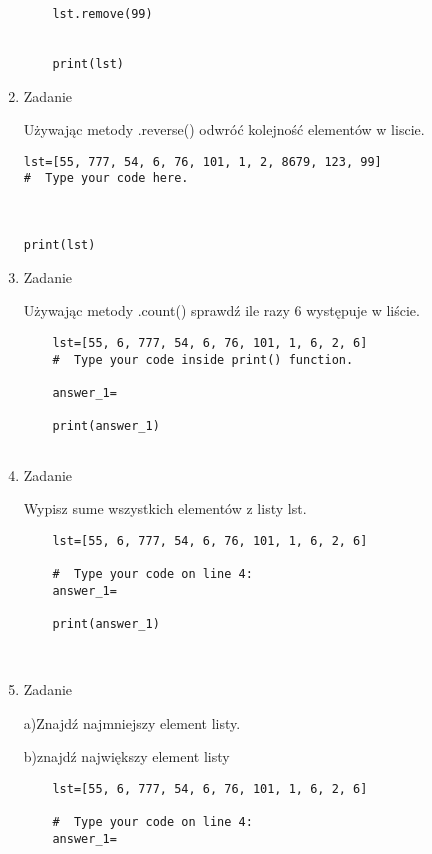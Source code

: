 \documentclass[11pt]{article}
\begin{document}
\begin{enumerate}
\begin{lstlisting}
	lst.remove(99)
	
	
	print(lst)
\end{lstlisting}

	\item
\begin{Large}
	Zadanie
\end{Large}
\par
Używając metody .reverse() odwróć kolejność elementów w liscie.
\begin{lstlisting}	
lst=[55, 777, 54, 6, 76, 101, 1, 2, 8679, 123, 99]
#  Type your code here.



print(lst)
\end{lstlisting}

	\item
\begin{Large}
	Zadanie
\end{Large}
\par
Używając metody .count() sprawdź ile razy 6 występuje w liście.
\begin{lstlisting}	
	lst=[55, 6, 777, 54, 6, 76, 101, 1, 6, 2, 6]
	#  Type your code inside print() function.
	
	answer_1=
	
	print(answer_1)
	
\end{lstlisting}


	\item
\begin{Large}
	Zadanie
\end{Large}
\par
Wypisz sume wszystkich elementów z listy lst.
\begin{lstlisting}	
	lst=[55, 6, 777, 54, 6, 76, 101, 1, 6, 2, 6]
	
	#  Type your code on line 4:
	answer_1=
	
	print(answer_1)
	
	
\end{lstlisting}


	\item
\begin{Large}
	Zadanie
\end{Large}
\par
a)Znajdź najmniejszy element listy.
\par
b)znajdź największy element listy
\begin{lstlisting}	
	lst=[55, 6, 777, 54, 6, 76, 101, 1, 6, 2, 6]
	
	#  Type your code on line 4:
	answer_1=
	

\end{lstlisting}
\end{enumerate}
\end{document}
